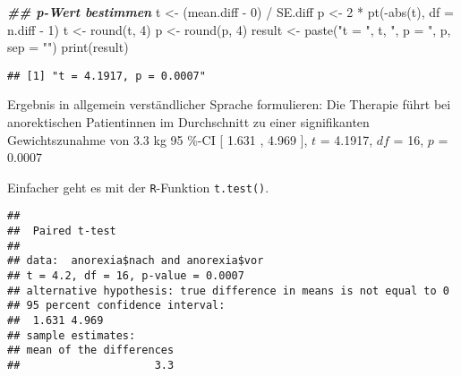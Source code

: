 \documentclass[
]{book}
\newenvironment{Shaded}{\begin{snugshade}}{\end{snugshade}}
\newcommand{\AttributeTok}[1]{\textcolor[rgb]{0.77,0.63,0.00}{#1}}
\newcommand{\ConstantTok}[1]{\textcolor[rgb]{0.00,0.00,0.00}{#1}}
\newcommand{\DecValTok}[1]{\textcolor[rgb]{0.00,0.00,0.81}{#1}}
\newcommand{\DocumentationTok}[1]{\textcolor[rgb]{0.56,0.35,0.01}{\textbf{\textit{#1}}}}
\newcommand{\FunctionTok}[1]{\textcolor[rgb]{0.00,0.00,0.00}{#1}}
\newcommand{\NormalTok}[1]{#1}
\newcommand{\OtherTok}[1]{\textcolor[rgb]{0.56,0.35,0.01}{#1}}
\newcommand{\SpecialCharTok}[1]{\textcolor[rgb]{0.00,0.00,0.00}{#1}}
\newcommand{\StringTok}[1]{\textcolor[rgb]{0.31,0.60,0.02}{#1}}
\begin{document}
\begin{Shaded}
\begin{Highlighting}[]
\DocumentationTok{\#\# p{-}Wert bestimmen}
\NormalTok{t }\OtherTok{\textless{}{-}}\NormalTok{ (mean.diff }\SpecialCharTok{{-}} \DecValTok{0}\NormalTok{) }\SpecialCharTok{/}\NormalTok{ SE.diff}
\NormalTok{p }\OtherTok{\textless{}{-}} \DecValTok{2} \SpecialCharTok{*} \FunctionTok{pt}\NormalTok{(}\SpecialCharTok{{-}}\FunctionTok{abs}\NormalTok{(t), }\AttributeTok{df =}\NormalTok{ n.diff }\SpecialCharTok{{-}} \DecValTok{1}\NormalTok{)}
\NormalTok{t }\OtherTok{\textless{}{-}} \FunctionTok{round}\NormalTok{(t, }\DecValTok{4}\NormalTok{)}
\NormalTok{p }\OtherTok{\textless{}{-}} \FunctionTok{round}\NormalTok{(p, }\DecValTok{4}\NormalTok{)}
\NormalTok{result }\OtherTok{\textless{}{-}} \FunctionTok{paste}\NormalTok{(}\StringTok{"t = "}\NormalTok{, t, }\StringTok{", p = "}\NormalTok{, p, }\AttributeTok{sep =} \StringTok{""}\NormalTok{)  }
\FunctionTok{print}\NormalTok{(result)}
\end{Highlighting}
\end{Shaded}

\begin{verbatim}
## [1] "t = 4.1917, p = 0.0007"
\end{verbatim}

Ergebnis in allgemein verständlicher Sprache formulieren: Die Therapie führt bei anorektischen Patientinnen im Durchschnitt zu einer signifikanten Gewichtszunahme von 3.3 kg 95 \%-CI {[} 1.631 , 4.969 {]}, \(t\) = 4.1917, \(df\) = 16, \(p\) = 0.0007

Einfacher geht es mit der \texttt{R}-Funktion \texttt{t.test()}.

\begin{Shaded}
\end{Shaded}

\begin{verbatim}
## 
##  Paired t-test
## 
## data:  anorexia$nach and anorexia$vor
## t = 4.2, df = 16, p-value = 0.0007
## alternative hypothesis: true difference in means is not equal to 0
## 95 percent confidence interval:
##  1.631 4.969
## sample estimates:
## mean of the differences 
##                     3.3
\end{verbatim}
\end{document}
